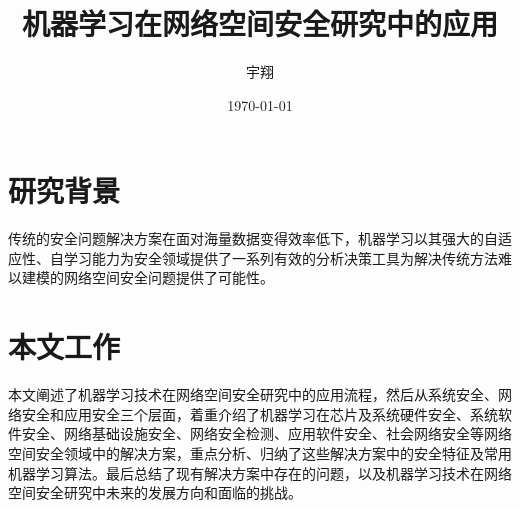 \documentclass[UTF8]{ctexart}
\title{\heiti 机器学习在网络空间安全研究中的应用}
\author{\kaishu 宇翔}
\date{\today}
\begin{document}
    
    \maketitle

    \clearpage
    \section{研究背景}\label{sec:diyijie}
	传统的安全问题解决方案在面对海量数据变得效率低下，机器学习以其强大的自适应性、自学习能力为安全领域提供了一系列有效的分析决策工具为解决传统方法难以建模的网络空间安全问题提供了可能性。
	\clearpage

    \section{本文工作}\label{sec:dierjie}
	本文阐述了机器学习技术在网络空间安全研究中的应用流程，然后从系统安全、网络安全和应用安全三个层面，着重介绍了机器学习在芯片及系统硬件安全、系统软件安全、网络基础设施安全、网络安全检测、应用软件安全、社会网络安全等网络空间安全领域中的解决方案，重点分析、归纳了这些解决方案中的安全特征及常用机器学习算法。最后总结了现有解决方案中存在的问题，以及机器学习技术在网络空间安全研究中未来的发展方向和面临的挑战。
	\clearpage
\end{document}
